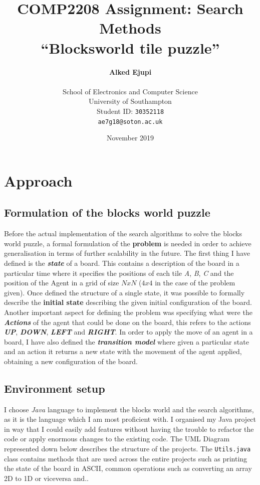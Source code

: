\documentclass{article}
\title{COMP2208 Assignment: Search Methods \\“Blocksworld tile puzzle”}
\author{
  {\textbf{Alked Ejupi}}\\
  \\
  School of Electronics and Computer Science\\
  University of Southampton\\
  Student ID:   \texttt{30352118} \\
  \texttt{ae7g18@soton.ac.uk}
}
\date{November 2019}
\begin{document}
\maketitle

\vfil \break
\tableofcontents
\vfil \break

\section{Approach}
\subsection{Formulation of the blocks world puzzle}
Before the actual implementation of the search algorithms to solve the blocks world puzzle, a formal formulation of the \textbf{problem} is needed in order to achieve generalisation in terms of further scalability in the future. The first thing I have defined is the\textit{ \textbf{state} }of a board. This contains a description of the board in a particular time where it specifies the positions of each tile \textit{A}, \textit{B}, \textit{C} and the position of the Agent in a grid of size $NxN$ ($4x4$ in the case of the problem given). Once defined the structure of a single state, it was possible to formally describe the \textbf{initial state} describing the given initial configuration of the board. Another important aspect for defining the problem was specifying what were the \textbf{\textit{Actions}} of the agent that could be done on the board, this refers to the actions \textbf{\textit{UP}}, \textbf{\textit{DOWN}}, \textbf{\textit{LEFT}} and \textbf{\textit{RIGHT}}. In order to apply the move of an agent in a board, I have also defined the\textit{\textbf{ transition model}} where given a particular state and an action it returns a new state with the movement of the agent applied, obtaining a new configuration of the board. 

\subsection{Environment setup}

I choose \textit{Java} language to implement the blocks world and the search algorithms, as it is the language which I am most proficient with. I organised my Java project in way that I could easily add features without having the trouble to refactor the code or apply enormous changes to the existing code. The UML Diagram represented down below describes the structure of the projects. The \texttt{Utils.java} class contains methods that are used across the entire projects such as printing the state of the board in ASCII, common operations such as converting an array 2D to 1D or viceversa and..
\end{document}
